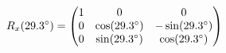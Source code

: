 \documentclass[preview]{standalone}
\begin{document}
\begin{align*}
\special{dvisvgm:raw <g id='unique000'>}R_x(29.3^\circ) = \begin{pmatrix} 1 & 0 & 0 \\ 0 & \cos(29.3^\circ) & -\sin(29.3^\circ) \\ 0 & \sin(29.3^\circ) & \cos(29.3^\circ) \end{pmatrix}\special{dvisvgm:raw </g>}
\end{align*}
\end{document}
